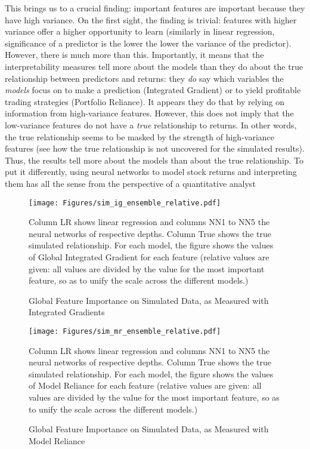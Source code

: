 		This brings us to a crucial finding: important features are important because they have high variance. On the first sight, the finding is trivial: features with higher variance offer a higher opportunity to learn (similarly in linear regression, significance of a predictor is the lower the lower the variance of the predictor). However, there is much more than this. Importantly, it means that the interpretability measures tell more about the models than they do about the true relationship between predictors and returns: they \textit{do} say which variables the \textit{models} focus on to make a prediction (Integrated Gradient) or to yield profitable trading strategies (Portfolio Reliance). It appears they do that by relying on information from high-variance features. However, this does not imply that the low-variance features do not have a \textit{true} relationship to returns. In other words, the true relationship seems to be masked by the strength of high-variance features (see how the true relationship is not uncovered for the simulated results). Thus, the results tell more about the models than about the true relationship. To put it differently, using neural networks to model stock returns and interpreting them has all the sense from the perspective of a quantitative analyst 
		
		
		
		\begin{figure}
			\centering
			\texttt{[image: Figures/sim\_ig\_ensemble\_relative.pdf]}
			\caption{Global Feature Importance on Simulated Data, as Measured with Integrated Gradients}
			\label{fig:sim_ig_ensemble_relative}
			\medskip
			\small
			Column LR shows linear regression and columns NN1 to NN5 the neural networks of respective depths. Column True shows the true simulated relationship. For each model, the figure shows the values of Global Integrated Gradient for each feature (relative values are given: all values are divided by the value for the most important feature, so as to unify the scale across the different models.)
		\end{figure}
		
		\begin{figure}
			\centering
			\texttt{[image: Figures/sim\_mr\_ensemble\_relative.pdf]}
			\caption{Global Feature Importance on Simulated Data, as Measured with Model Reliance}
			\label{fig:sim_mr_ensemble_relative}
			\medskip
			\small
			Column LR shows linear regression and columns NN1 to NN5 the neural networks of respective depths. Column True shows the true simulated relationship. For each model, the figure shows the values of Model Reliance for each feature (relative values are given: all values are divided by the value for the most important feature, so as to unify the scale across the different models.)
		\end{figure}
	
